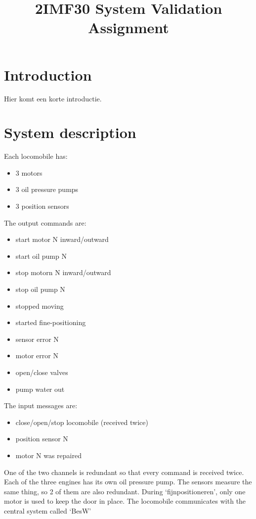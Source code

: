 \documentclass{article}
\title{2IMF30 System Validation Assignment}
\begin{document}
\section{Introduction}
Hier komt een korte introductie.

\section{System description}
Each locomobile has:
\begin{itemize}
    \item 3 motors
    \item 3 oil pressure pumps
    \item 3 position sensors
\end{itemize}
The output commands are:
\begin{itemize}
    \item start motor N inward/outward
    \item start oil pump N
    \item stop motorn N inward/outward
    \item stop oil pump N

    \item stopped moving
    \item started fine-positioning
    \item sensor error N
    \item motor error N

    \item open/close valves
    \item pump water out
\end{itemize}
The input messages are:
\begin{itemize}
    \item close/open/stop locomobile (received twice)
    \item position sensor N
    \item motor N was repaired
\end{itemize}

One of the two channels is redundant so that every command is received twice. Each of the three engines has its own oil pressure pump. The sensors measure the same thing, so 2 of them are also redundant. During `fijnpositioneren', only one motor is used to keep the door in place. The locomobile communicates with the central system called `BesW'
\end{document}
